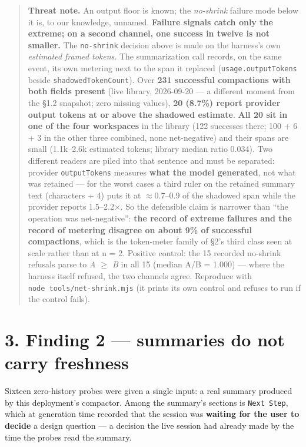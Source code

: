 \documentclass[
]{article}
\newcounter{none} %
\begin{document}
\begin{quote}
\textbf{Threat note.} An output floor is known; the \emph{no-shrink}
failure mode below it is, to our knowledge, unnamed. \textbf{Failure
signals catch only the extreme; on a second channel, one success in
twelve is not smaller.} The \texttt{no-shrink} decision above is made on
the harness's own \emph{estimated framed tokens}. The summarization call
records, on the same event, its own metering next to the span it
replaced (\texttt{usage.outputTokens} beside
\texttt{shadowedTokenCount}). Over \textbf{231 successful compactions
with both fields present} (live library, 2026-09-20 --- a different
moment from the §1.2 snapshot; zero missing values), \textbf{20 (8.7\%)
report provider output tokens at or above the shadowed estimate}.
\textbf{All 20 sit in one of the four workspaces} in the library (122
successes there; 100 + 6 + 3 in the other three combined, none
net-negative) and their spans are small (1.1k--2.6k estimated tokens;
library median ratio 0.034). Two different readers are piled into that
sentence and must be separated: provider \texttt{outputTokens} measures
\textbf{what the model generated}, not what was retained --- for the
worst cases a third ruler on the retained summary text (characters ÷ 4)
puts it at \ensuremath{\approx}0.7--0.9 of the shadowed span while the
provider reports 1.5--2.2×. So the defensible claim is narrower than
``the operation was net-negative'': \textbf{the record of extreme
failures and the record of metering disagree on about 9\% of successful
compactions}, which is the token-meter family of §2's third class seen
at scale rather than at n = 2. Positive control: the 15 recorded
no-shrink refusals parse to \emph{A \ensuremath{\geq} B} in all 15
(median A/B = 1.000) --- where the harness itself refused, the two
channels agree. Reproduce with \texttt{node\ tools/net-shrink.mjs} (it
prints its own control and refuses to run if the control fails).
\end{quote}

\section{3. Finding 2 --- summaries do not carry
freshness}\label{finding-2-summaries-do-not-carry-freshness}

Sixteen zero-history probes were given a single input: a real summary
produced by this deployment's compactor. Among the summary's sections is
\texttt{Next\ Step}, which at generation time recorded that the session
was \textbf{waiting for the user to decide} a design question --- a
decision the live session had already made by the time the probes read
the summary.
\end{document}
